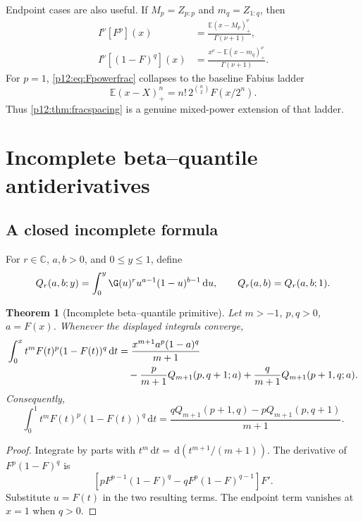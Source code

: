 \documentclass[11pt,oneside]{article}
\newtheorem{theorem}{Theorem}[section]
\theoremstyle{definition}
\theoremstyle{remark}
\newcommand{\F}{F}
\newcommand{\E}{\mathbb E}
\newcommand{\C}{\mathbb C}
\newcommand{\dd}{\,\mathrm d}
\newcommand{\1}{\mathbf 1}
\begin{document}
Endpoint cases are also useful.  If \(M_p=Z_{p:p}\) and \(m_q=Z_{1:q}\), then
\begin{align}
 I^\nu[\F^p](x)
 &=\frac{\E(x-M_p)_+^\nu}{\Gamma(\nu+1)},\label{p12:eq:Fpowerfrac}\\
 I^\nu[(1-\F)^q](x)
 &=\frac{x^\nu-\E(x-m_q)_+^\nu}{\Gamma(\nu+1)}.\label{p12:eq:survfrac}
\end{align}
For \(p=1\), \eqref{p12:eq:Fpowerfrac} collapses to the baseline Fabius ladder
\begin{equation}\label{p12:eq:Fvolterraladder}
 \E(x-X)_+^n=n!\,2^{\binom n2}\F(x/2^n).
\end{equation}
Thus \cref{p12:thm:fracspacing} is a genuine mixed-power extension of that ladder.

\section{Incomplete beta--quantile antiderivatives}

\subsection{A closed incomplete formula}

For \(r\in\C\), \(a,b>0\), and \(0\le y\le1\), define
\begin{equation}\label{p12:eq:Qdef}
 Q_r(a,b;y)=\int_0^y\G(u)^r u^{a-1}(1-u)^{b-1}\dd u,
 \qquad Q_r(a,b)=Q_r(a,b;1).
\end{equation}

\begin{theorem}[Incomplete beta--quantile primitive\tagnew]\label{p12:thm:incompleteQ}
Let \(m>-1\), \(p,q>0\), \(a=\F(x)\).  Whenever the displayed integrals
converge,
\begin{align}
 \int_0^x t^m\F(t)^p(1-\F(t))^q\dd t
 &=\frac{x^{m+1}a^p(1-a)^q}{m+1}\notag\\
 &\quad-\frac{p}{m+1}Q_{m+1}(p,q+1;a)
 +\frac{q}{m+1}Q_{m+1}(p+1,q;a).
 \label{p12:eq:incompleteQ}
\end{align}
Consequently,
\begin{equation}\label{p12:eq:defQ}
 \int_0^1 t^m\F(t)^p(1-\F(t))^q\dd t
 =\frac{qQ_{m+1}(p+1,q)-pQ_{m+1}(p,q+1)}{m+1}.
\end{equation}
\end{theorem}

\begin{proof}
Integrate by parts with \(t^m\dd t=\dd(t^{m+1}/(m+1))\).  The derivative of
\(\F^p(1-\F)^q\) is
\[
 \left[p\F^{p-1}(1-\F)^q-q\F^p(1-\F)^{q-1}\right]\F'.
\]
Substitute \(u=\F(t)\) in the two resulting terms.  The endpoint term vanishes
at \(x=1\) when \(q>0\).
\end{proof}
\end{document}
